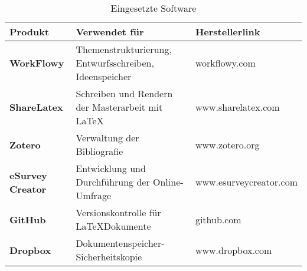 \documentclass[main.tex]{subfiles}
\begin{document}

\begin{table}[h]
\centering
\caption{Eingesetzte Software}
\label{used-sw}


\begin{tabular}{ |p{3cm}|p{9cm}|p{3.5cm}| }


\hline
\rowcolor[HTML]{C0C0C0} 
\textbf{Produkt} & \textbf{Verwendet für} & \textbf{Herstellerlink}\\ 
\hline


\textbf{WorkFlowy} & Themenstrukturierung, Entwurfsschreiben, Ideenspeicher & workflowy.com \\ \hline
\textbf{ShareLatex} & Schreiben und Rendern der Masterarbeit mit \LaTeX & www.sharelatex.com \\ \hline
\textbf{Zotero} & Verwaltung der Bibliografie & www.zotero.org \\ \hline
\textbf{eSurvey Creator} & Entwicklung und Durchführung der Online-Umfrage & www.esurveycreator.com \\ \hline
\textbf{GitHub} & Versionskontrolle für \LaTeX  Dokumente & github.com \\ \hline
\textbf{Dropbox} & Dokumentenspeicher-Sicherheitskopie & www.dropbox.com \\ \hline

\end{tabular}
\end{table}
\end{document}
